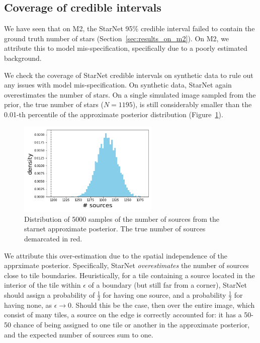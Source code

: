 \subsection{Coverage of credible intervals}

We have seen that on M2, the StarNet 95\% credible interval failed
to contain the ground truth number of stars (Section~\ref{sec:results_on_m2}).
On M2, we attribute this to model mis-specification, specifically due to a poorly
estimated background.

We check the coverage of StarNet credible intervals on synthetic data
to rule out any issues with model mis-specification.
On synthetic data, StarNet again overestimates the number of stars.
On a single simulated image sampled from the prior,
the true number of stars ($N = 1195$),
is still considerably smaller than the 0.01-th percentile of
the approximate posterior distribution (Figure~\ref{fig:starnet_density}).


\begin{figure}[tb]
    \centering
    \includegraphics[width=0.6\textwidth]{./figures/coverage/starnet_histogram.png}
    \vspace{-0.4cm}
    \caption{Distribution of 5000 samples of the number of sources from the starnet approximate posterior.
    The true number of sources demarcated in red. }
    \label{fig:starnet_density}
\end{figure}

We attribute this over-estimation due to the spatial independence of the apprximate posterior.
Specifically, StarNet \textit{overestimates} the number of sources close to tile boundaries.
Heuristically, for a tile containing
a source located in the interior of the tile
within $\epsilon$ of a boundary (but still far from a corner),
StarNet should assign a probability of $\frac{1}{2}$ for
having one source, and a probability $\frac{1}{2}$ for having none, as $\epsilon \rightarrow 0$.
Should this be the case, then over the entire image, which consist of many tiles,
a source on the edge is correctly accounted for: it has a 50-50 chance of being assigned to one tile or another
in the approximate posterior, and the expected number of sources sum to one.

